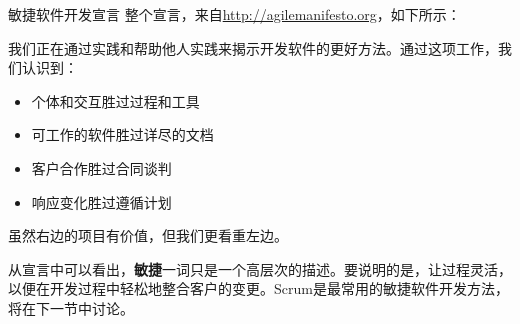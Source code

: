 \begin{myTip}{敏捷软件开发宣言}
整个宣言，来自\url{http://agilemanifesto.org}，如下所示：

我们正在通过实践和帮助他人实践来揭示开发软件的更好方法。通过这项工作，我们认识到：

\begin{itemize}
\item
个体和交互胜过过程和工具

\item
可工作的软件胜过详尽的文档

\item
客户合作胜过合同谈判

\item
响应变化胜过遵循计划
\end{itemize}

虽然右边的项目有价值，但我们更看重左边。
\end{myTip}

从宣言中可以看出，\textbf{敏捷}一词只是一个高层次的描述。要说明的是，让过程灵活，以便在开发过程中轻松地整合客户的变更。Scrum是最常用的敏捷软件开发方法，将在下一节中讨论。


